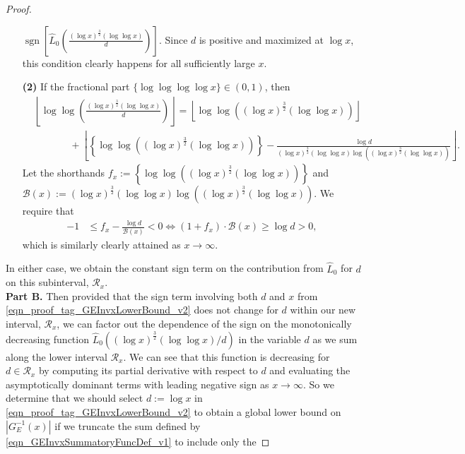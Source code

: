 \documentclass[11pt,reqno,a4letter]{article}
\numberwithin{figure}{section}
\numberwithin{table}{section}
\newcommand{\floor}[1]{\left\lfloor #1 \right\rfloor}
\theoremstyle{plain}
\numberwithin{theorem}{section}
\theoremstyle{definition}
\begin{document}
\begin{proof}
\begin{itemize}[itemsep=0pt,topsep=0pt,leftmargin=0.35in]
     $\operatorname{sgn}\left[\widehat{L}_0\left(\frac{(\log x)^{\frac{3}{2}} (\log\log x)}{d}\right)\right]$. 
     Since $d$ is positive and maximized at $\log x$, 
     this condition clearly happens for all sufficiently large $x$. 
\item[\textbf{(2)}] If the fractional part $\{\log\log\log\log x\} \in (0, 1)$, then 
     \begin{align*} 
     & \floor{\log\log\left(\frac{(\log x)^{\frac{3}{2}} (\log\log x)}{d}\right)} = 
          \floor{\log\log\left((\log x)^{\frac{3}{2}} (\log\log x)\right)} \\ 
          & \phantom{\qquad =\ } + 
          \floor{\left\{\log\log\left((\log x)^{\frac{3}{2}} (\log\log x)\right)\right\} - 
          \frac{\log d}{(\log x)^{\frac{3}{2}} (\log\log x) \log\left( 
          (\log x)^{\frac{3}{2}} (\log\log x)\right)}}. 
     \end{align*} 
     Let the shorthands $f_x := \left\{\log\log\left((\log x)^{\frac{3}{2}} (\log\log x)\right)\right\}$ and 
     $\mathcal{B}(x) := (\log x)^{\frac{3}{2}} (\log\log x) \log\left((\log x)^{\frac{3}{2}} (\log\log x)\right)$. 
     We require that 
     \begin{align*} 
     -1 & \leq f_x - \frac{\log d}{\mathcal{B}(x)} < 0 \iff 
          (1 + f_x) \cdot \mathcal{B}(x) \geq \log d > 0, 
     \end{align*} 
     which is similarly clearly attained as $x \rightarrow \infty$. 
\end{itemize} 
In either case, we obtain the constant sign term on the contribution from 
$\widehat{L}_0$ for $d$ on this subinterval, $\mathcal{R}_x$. \\ 
\textbf{Part B.} 
Then provided that the sign term involving both $d$ and $x$ 
from \eqref{eqn_proof_tag_GEInvxLowerBound_v2} does not change for $d$ within our new interval, 
$\mathcal{R}_x$, 
we can factor out the dependence of the sign on the monotonically 
decreasing function 
$\widehat{L}_0\left((\log x)^{\frac{3}{2}} (\log\log x)/d\right)$ 
in the variable $d$ as we sum along the lower interval $\mathcal{R}_x$. 
We can see that this function is decreasing 
for $d \in \mathcal{R}_x$ by computing its partial derivative with respect to $d$ and 
evaluating the asymptotically dominant terms with leading negative sign as 
$x \rightarrow \infty$. 
So we determine that we should select $d := \log x$ in 
\eqref{eqn_proof_tag_GEInvxLowerBound_v2} to 
obtain a global lower bound on $|G_E^{-1}(x)|$ if we truncate the sum 
defined by \eqref{eqn_GEInvxSummatoryFuncDef_v1} to include only the 

\end{proof}
\end{document}
